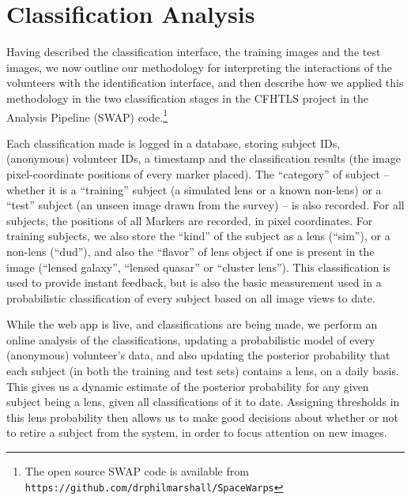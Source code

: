 \documentclass[useAMS,usenatbib,a4paper]{mn2e}
\begin{document}
\section{Classification Analysis}
\label{sec:swap}

Having described the classification interface, the training images and the
test images,  we now outline our methodology for interpreting the interactions
of the volunteers with the identification interface, and then describe how we
applied this methodology in the two classification stages in the CFHTLS
project in the \SW Analysis Pipeline (SWAP) code.\footnote{The open source
SWAP code is available from
\texttt{https://github.com/drphilmarshall/SpaceWarps}}

Each classification made is logged in a database, storing subject IDs,
(anonymous) volunteer IDs, a timestamp and the classification results (the image pixel-coordinate positions of every marker placed).  The
``category'' of subject -- whether it is a ``training'' subject (a simulated
lens or a known non-lens) or a ``test'' subject (an unseen image drawn from the
survey) -- is also recorded. For all subjects, the positions of all Markers are
recorded, in pixel coordinates. For training subjects, we also store the
``kind'' of the subject as a lens (``sim''), or a non-lens (``dud''), and also
the ``flavor'' of lens object if one is present in the image (``lensed galaxy'',
``lensed quasar'' or ``cluster lens'').  This classification is used to provide
instant feedback, but is also the basic measurement used in a probabilistic
classification of every subject based on all image views to date.

While the \SW web app is live, and classifications are being made, we perform an
online analysis of the classifications,  updating a probabilistic model of every
(anonymous) volunteer's data, and also updating the posterior probability that
each subject (in both the training and test sets) contains a lens, on a daily
basis. This gives us a dynamic estimate of the posterior probability for  any
given  subject being a lens, given all classifications of it to date. Assigning
thresholds in this lens probability then allows us to make good decisions about
whether or not to retire a subject from the system, in order to focus attention
on new images.
\end{document}
